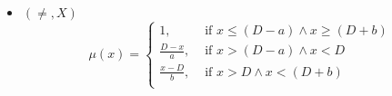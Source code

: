 \documentclass{llncs}
\begin{document}
\begin{itemize}
\item $\left(\neq, X \right)$
	\begin{equation}
		\label{eq:ikc-neq}
		  \mu\left(x \right) =
		      \begin{cases}
				  1, & \mbox{ if } x \leq \left(D-a\right) \wedge x \geq \left(D+b \right)\\
				  \frac{D-x}{a} , & \mbox{ if } x > \left(D-a\right) \wedge x< D\\
				  \frac{x-D}{b} , & \mbox{ if } x > D \wedge x< \left(D+b \right)\\	
				  \end{cases}
		\end{equation}

	
\end{itemize}
\end{document}
